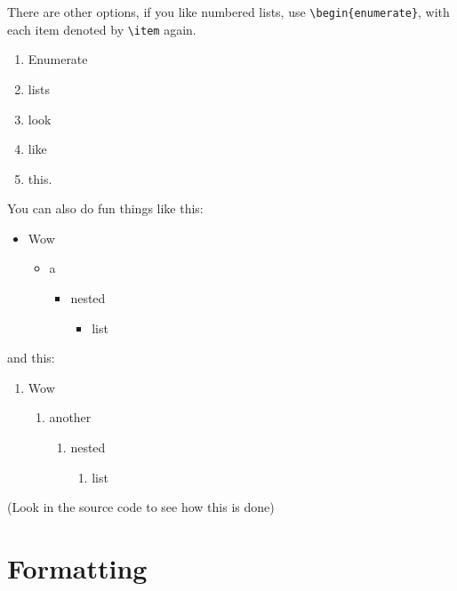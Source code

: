 There are other options, if you like numbered lists, use \verb+\begin{enumerate}+, with each item denoted by \verb+\item+ again.

\begin{enumerate}
    \item Enumerate
    \item lists
    \item look
    \item like
    \item this.
\end{enumerate}

You can also do fun things like this:

\begin{itemize}
    \item Wow
    \begin{itemize}
        \item a
        \begin{itemize}
            \item nested
            \begin{itemize}
                \item list
            \end{itemize}
        \end{itemize}
    \end{itemize}
\end{itemize}

and this:

\begin{enumerate}
    \item Wow
    \begin{enumerate}
        \item another
        \begin{enumerate}
            \item nested
            \begin{enumerate}
                \item list
            \end{enumerate}
        \end{enumerate}
    \end{enumerate}
\end{enumerate}

(Look in the source code to see how this is done)

\section{Formatting}

